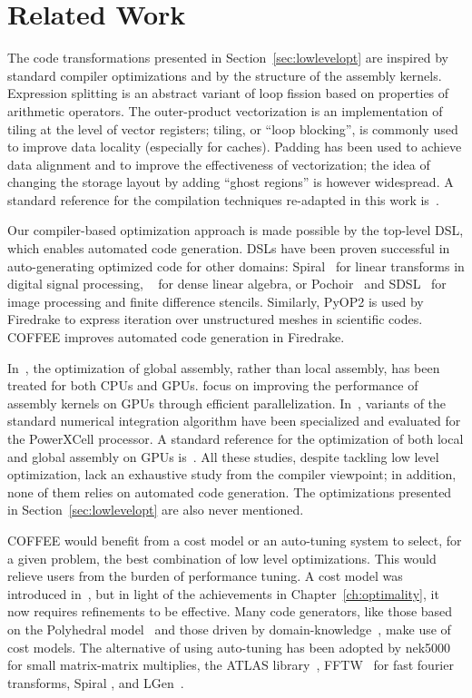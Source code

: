 \section{Related Work}
\label{sec:coffee-related-work}
The code transformations presented in Section~\ref{sec:lowlevelopt} are inspired by standard compiler optimizations and by the structure of the assembly kernels. Expression splitting is an abstract variant of loop fission based on properties of arithmetic operators. The outer-product vectorization is an implementation of tiling at the level of vector registers; tiling, or ``loop blocking'', is commonly used to improve data locality (especially for caches). Padding has been used to achieve data alignment and to improve the effectiveness of vectorization; the idea of changing the storage layout by adding ``ghost regions'' is however widespread. A standard reference for the compilation techniques re-adapted in this work is~\cite{dragonbook}.

Our compiler-based optimization approach is made possible by the top-level DSL, which enables automated code generation. DSLs have been proven successful in auto-generating optimized code for other domains: Spiral~\citep{Pueschel:05} for linear transforms in digital signal processing, ~\citep{Spampinato:14} for dense linear algebra, or Pochoir~\citep{pochoir} and SDSL~\citep{stencil-compiler} for image processing and finite difference stencils. Similarly, PyOP2 is used by Firedrake to express iteration over unstructured meshes in scientific codes. COFFEE improves automated code generation in Firedrake.

In~\cite{Markall20101815}, the optimization of global assembly, rather than local assembly, has been treated for both CPUs and GPUs. \cite{petsc-integration-gpu} focus on improving the performance of assembly kernels on GPUs through efficient parallelization. In~\cite{assembly-opencl}, variants of the standard numerical integration algorithm have been specialized and evaluated for the PowerXCell processor. A standard reference for the optimization of both local and global assembly on GPUs is~\citep{fem-gpu-study}. All these studies, despite tackling low level optimization, lack an exhaustive study from the compiler viewpoint; in addition, none of them relies on automated code generation. The optimizations presented in Section~\ref{sec:lowlevelopt} are also never mentioned. 

COFFEE would benefit from a cost model or an auto-tuning system to select, for a given problem, the best combination of low level optimizations. This would relieve users from the burden of performance tuning. A cost model was introduced in~\cite{Luporini-coffee}, but in light of the achievements in Chapter~\ref{ch:optimality}, it now requires refinements to be effective. Many code generators, like those based on the Polyhedral model~\citep{pluto} and those driven by domain-knowledge~\citep{modeldriven}, make use of cost models. The alternative of using auto-tuning has been adopted by nek5000~\citep{nek5000} for small matrix-matrix multiplies, the ATLAS library~\citep{ATLAS}, FFTW~\citep{FFTW} for fast fourier transforms, Spiral \citep{Pueschel:05}, and LGen~\citep{Spampinato:14}. 


